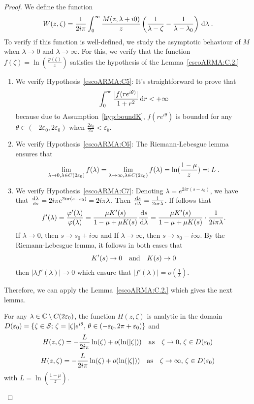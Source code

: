 \begin{proof}
We define the function
\begin{align}\label{def:W}
    W(z, \zeta) = \frac{1}{2i\pi }\int_0^\infty  \frac{M(z,\lambda+i0)}{z}\left( \frac{1}{\lambda-\zeta} - \frac{1}{\lambda-\lambda_0}\right) \,\mathrm{d} \lambda 
    \; .
\end{align}
To verify if this function is well-defined, we study the asymptotic behaviour of $M$ when $\lambda \to 0$ and $\lambda \to \infty$. For this, we verify that the function $f(\zeta) = \ln(\frac{\varphi(\zeta)}{z})$ satisfies the hypothesis of the Lemma~\ref{escoARMA:C.2.}
\begin{enumerate}
\item We verify Hypothesis~\eqref{escoARMA:C5}: It's straightforward to prove that 
    $$\int_0^\infty \frac{|f(r e^{i\theta)}|}{1+r^2}\,\mathrm{d} r < +\infty$$ because due to Assumption~\ref{hyp:boundK}, $f(re^{i\theta})$ is bounded for any $\theta \in (-2\varepsilon_0, 2\varepsilon_0)$ when $\frac{2\varepsilon_0}{2\pi} < \varepsilon_b$. 
    \item We verify Hypothesis~\eqref{escoARMA:C6}: The Riemann-Lebesgue lemma ensures that 
    $$ \lim_{\lambda \to 0, \lambda \in C(2\varepsilon_0)} f(\lambda) = 
     \lim_{\lambda \to \infty, \lambda \in C(2\varepsilon_0)} f(\lambda)=\ln(\frac{1-\mu}{z}) 
 \eqqcolon L\; .$$
    \item We verify Hypothesis~\eqref{escoARMA:C7}: Denoting $\lambda = e^{2i\pi(s-s_0)}$, we have that $\frac{\,\mathrm{d} \lambda}{\,\mathrm{d} s} = 2i\pi e^{2i\pi(s-s_0)} = 2i\pi \lambda$. Then 
    $\frac{\,\mathrm{d} s}{\,\mathrm{d} \lambda} = \frac{1}{2i\pi\lambda}$. 
    If follows that 
    $$f'(\lambda) = \frac{\varphi'(\lambda)}{\varphi(\lambda)} = \frac{\mu K'(s)}{1 - \mu + \mu K(s)}\frac{\,\mathrm{d} s}{\,\mathrm{d} \lambda} = \frac{\mu K'(s)}{1 - \mu + \mu K(s)} \cdot \frac{1}{2i\pi\lambda}. $$
    If $\lambda \to 0$, then $s \to s_0+i\infty$ and If $\lambda \to \infty$, then $s \to s_0-i\infty$.  By the Riemann-Lebesgue lemma, it follows in both cases that $$K'(s) \to 0 \quad \text{and} \quad K(s) \to 0$$ then  $|\lambda f'(\lambda)| \to 0$ which ensure that $|f'(\lambda)| = o(\frac{1}{\lambda})$. \\
\end{enumerate}
Therefore, we can apply the Lemma~\ref{escoARMA:C.2.} which gives the next lemma. 

\begin{lemma}\label{EscARMA:C2}For any $\lambda \in \mathbb{C} \setminus C(2\varepsilon_0)$, the function $H(z,\zeta)$ is analytic in the domain $D(\varepsilon_0) = \{ \zeta \in \mathcal{S}; \, \zeta = |\zeta|e^{i\theta}, \, \theta \in (-\varepsilon_0, 2\pi+\varepsilon_0)\}$ and 
$$ H(z, \zeta) = -\frac{L}{2i\pi } \ln(\zeta) + o(\ln(|\zeta|)) \quad \text{as} \quad \zeta\to 0,\, \zeta \in D(\varepsilon_0)$$ 
$$ H(z, \zeta) = -\frac{L}{2i\pi } \ln(\zeta) + o(\ln(|\zeta|)) \quad \text{as} \quad \zeta\to \infty,\, \zeta \in D(\varepsilon_0)$$ 
with $L = \ln(\frac{1-\mu}{z})$. 
\end{lemma}


\end{proof}
